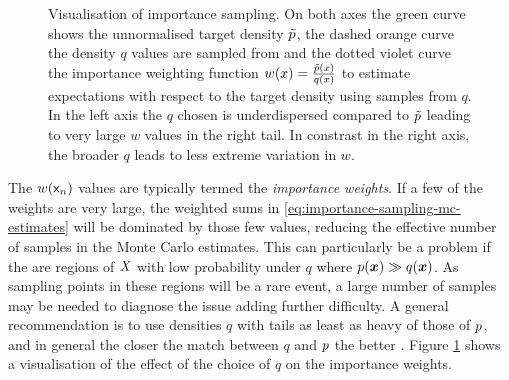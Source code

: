 \begin{figure}[t]
\centering
\pgfplotsset{cycle list/Dark2-3}
\begin{subfigure}[b]{.48\linewidth}
\centering
{}
\end{subfigure}
\begin{subfigure}[b]{.48\linewidth}
\centering
{}
\end{subfigure}
\caption[Visualisation of importance sampling.]{Visualisation of importance sampling. On both axes the green curve shows the unnormalised target density $\tilde{p}$, the dashed orange curve the density $q$ values are sampled from and the dotted violet curve the importance weighting function $w(x) = \frac{\tilde{p}(x)}{q(x)}$ to estimate expectations with respect to the target density using samples from $q$. In the left axis the $q$ chosen is underdispersed compared to $\tilde{p}$ leading to very large $w$ values in the right tail. In constrast in the right axis, the broader $q$ leads to less extreme variation in $w$.}
\label{fig:importance-sampling}
\end{figure}

The $w(\mathsf{x}_n)$ values are typically termed the \emph{importance weights}. If a few of the weights are very large, the weighted sums in \eqref{eq:importance-sampling-mc-estimates} will be dominated by those few values, reducing the effective number of samples in the Monte Carlo estimates. This can particularly be a problem if the are regions of $\mathit{X}$ with low probability under $q$ where $p(\boldsymbol{x}) \gg q(\boldsymbol{x})$. As sampling points in these regions will be a rare event, a large number of samples may be needed to diagnose the issue adding further difficulty. A general recommendation is to use densities $q$ with tails as least as heavy of those of $p$, and in general the closer the match between $q$ and $p$ the better \citep{mackay2003information,owen2013importance}. Figure \ref{fig:importance-sampling} shows a visualisation of the effect of the choice of $q$ on the importance weights.

